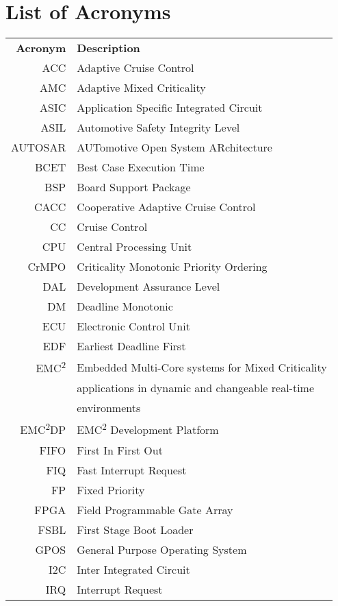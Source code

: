 \stoptocwriting
\chapter{List of Acronyms}
\begin{tabular}{r l}
\textbf{Acronym} 	& \textbf{Description} \vspace{.5em} \\
ACC					&Adaptive Cruise Control\\
AMC					&Adaptive Mixed Criticality\\
ASIC				&Application Specific Integrated Circuit\\
ASIL				&Automotive Safety Integrity Level\\
AUTOSAR				&AUTomotive Open System ARchitecture\\
BCET				&Best Case Execution Time\\
BSP					&Board Support Package\\
CACC				&Cooperative Adaptive Cruise Control\\
CC					&Cruise Control\\
CPU					&Central Processing Unit\\
CrMPO				&Criticality Monotonic Priority Ordering\\
DAL					&Development Assurance Level\\
DM					&Deadline Monotonic\\
ECU					&Electronic Control Unit\\
EDF					&Earliest Deadline First\\
EMC\textsuperscript{2} 	&Embedded Multi-Core systems for Mixed Criticality\\
 					&applications in dynamic and changeable real-time\\
 					&environments\\
EMC\textsuperscript{2}DP 	&EMC\textsuperscript{2} Development Platform\\
FIFO				&First In First Out\\
FIQ					&Fast Interrupt Request\\
FP					&Fixed Priority\\
FPGA				&Field Programmable Gate Array\\
FSBL				&First Stage Boot Loader\\
GPOS				&General Purpose Operating System\\
I2C					&Inter Integrated Circuit\\
IRQ					&Interrupt Request\\
\end{tabular}


